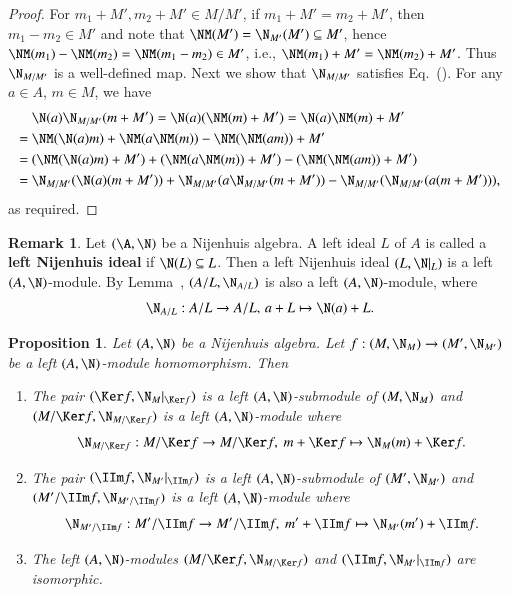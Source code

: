 \documentclass[12pt]{amsart}
\newtheorem{prop}[theorem]{Proposition}
\theoremstyle{definition}
\newtheorem{remark}[theorem]{Remark}
\begin{document}
\begin{proof}
For $m_1+M', m_2+M' \in M/M'$, if $m_1+M'=m_2+M'$, then
$m_1-m_2 \in M'$ and note that  $\NM(M')=\N_{M'}(M') \subseteq M'$, hence $\NM(m_1)-\NM(m_2)=\NM(m_1-m_2) \in M'$, i.e., $\NM(m_1)+M'=\NM(m_2)+M'$. Thus $\N_{M/M'}$ is a well-defined map. Next we show that $\N_{M/M'}$ satisfies Eq.~().
For any $a\in A$, $m\in M$, we have
\begin{align*}
&\  \N(a) \N_{M/M'}(m+M') =\N(a)(\NM(m)+M') = \N(a)\NM(m) + M' \\
=&\ \NM(\N(a)m)+\NM(a \NM(m))-\NM(\NM(am)) + M' \\
=&\ (\NM(\N(a)m)+M') + (\NM(a \NM(m))+M') - (\NM (\NM(am)) + M') \\
=&\ \N_{M/M'}(\N(a)(m+M'))+\N_{M/M'}(a\N_{M/M'}(m+M'))- \N_{M/M'}(\N_{M/M'}(a(m+M'))),
\end{align*}
as required.
\end{proof}

\begin{remark}
Let $(\A,\N)$ be a Nijenhuis algebra. A left ideal $L$ of $A$ is called a {\bf left Nijenhuis ideal} if $\N(L) \subseteq L$. Then a left Nijenhuis ideal $(L,\N|_L)$ is a left $(A,\N)$-module. By Lemma~, $(A/L, \N_{A/L})$ is also a left $(A,\N)$-module, where
\[
\N_{A/L}: A/L \rightarrow A/L, \, a+L \mapsto \N(a)+L.
\]
\end{remark}

\begin{prop}
Let $(A,\N)$ be a Nijenhuis algebra. Let $f: (M,\N_M) \to (M',\N_{M'})$ be a left $(A,\N)$-module homomorphism. Then 
\begin{enumerate}
\item {} The pair $(\Ker f, \N_{M}|_{\Ker f})$ is a left $(A,\N)$-submodule of $(M,\N_M)$ and $(M/\Ker f, \N_{M/\Ker f})$ is a left $(A,\N)$-module where 
\[
\N_{M/\Ker f}: M/\Ker f \to M/\Ker f, \ m+\Ker f \mapsto \N_M(m)+\Ker f.
\]
\item {}  The pair  $(\IIm f, \N_{M'}|_{\IIm f})$ is a left $(A,\N)$-submodule of $(M',\N_{M'})$ and $(M'/\IIm f, \N_{M'/\IIm f})$ is a left $(A,\N)$-module where
\[
\N_{M'/\IIm f}: M'/\IIm f \to M'/\IIm f, \ m'+\IIm f \mapsto \N_{M'}(m')+\IIm f.
\]

\item {} The left $(A,\N)$-modules $(M/\Ker f, \N_{M/\Ker f})$ and $(\IIm f, \N_{M'}|_{\IIm f})$ are isomorphic.
\end{enumerate}
\end{prop}
\end{document}
